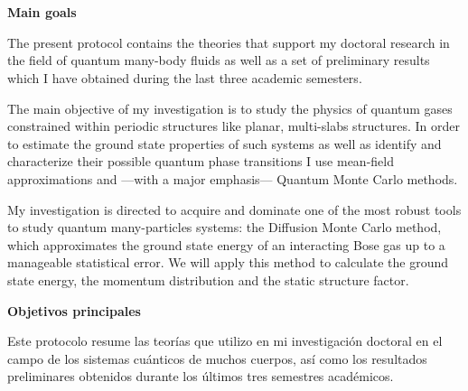 

\chapter*{}

\vspace{-1cm}

\begin{center}
	\fontsize{\chaptitlefontsize}{0}\selectfont \textbf{Main goals}
\end{center}

The present protocol contains the theories that support my doctoral research in the field of quantum many-body fluids
as well as a set of preliminary results which I have obtained during the last three academic semesters.

The main objective of my investigation is to study the physics of quantum gases constrained within periodic structures
like planar, multi-slabs structures. In order to estimate the ground state properties of such systems as well as
identify and characterize their possible quantum phase transitions I use mean-field approximations and
---with a major emphasis--- Quantum Monte Carlo methods.

My investigation is directed to acquire and dominate one of the most robust tools to study quantum many-particles
systems: the Diffusion Monte Carlo method, which approximates the ground state energy of an interacting Bose gas up to
a manageable statistical error. We will apply this method to calculate the ground state energy, the momentum
distribution and the static structure factor.


\vspace{1cm}


\begin{center}
	\fontsize{\chaptitlefontsize}{0}\selectfont \textbf{Objetivos principales}
\end{center}


Este protocolo resume las teorías que utilizo en mi investigación doctoral en el campo de los sistemas
cuánticos de muchos cuerpos, así como los resultados preliminares obtenidos durante los últimos tres semestres
académicos.

